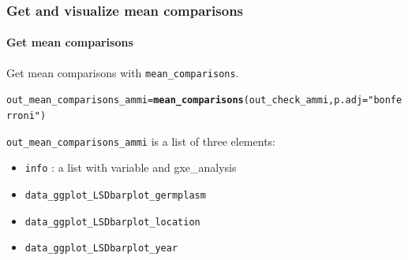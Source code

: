 \documentclass{article}\usepackage[]{graphicx}\usepackage[]{color}
\makeatletter
\newcommand{\hlstr}[1]{\textcolor[rgb]{0.192,0.494,0.8}{#1}}%
\newcommand{\hlopt}[1]{\textcolor[rgb]{0,0,0}{#1}}%
\newcommand{\hlstd}[1]{\textcolor[rgb]{0.345,0.345,0.345}{#1}}%
\newcommand{\hlkwb}[1]{\textcolor[rgb]{0.69,0.353,0.396}{#1}}%
\newcommand{\hlkwc}[1]{\textcolor[rgb]{0.333,0.667,0.333}{#1}}%
\newcommand{\hlkwd}[1]{\textcolor[rgb]{0.737,0.353,0.396}{\textbf{#1}}}%
\newenvironment{kframe}{%
 \def\at@end@of@kframe{}%
 \ifinner\ifhmode%
  \def\at@end@of@kframe{\end{minipage}}%
  \begin{minipage}{\columnwidth}%
 \fi\fi%
 \def\FrameCommand##1{\hskip\@totalleftmargin \hskip-\fboxsep
 \colorbox{shadecolor}{##1}\hskip-\fboxsep
     \hskip-\linewidth \hskip-\@totalleftmargin \hskip\columnwidth}%
 \MakeFramed {\advance\hsize-\width
   \@totalleftmargin\z@ \linewidth\hsize
   \@setminipage}}%
 {\par\unskip\endMakeFramed%
 \at@end@of@kframe}
\newenvironment{knitrout}{}{} %
\makeatother
\begin{document}


\subsubsection{Get and visualize mean comparisons}

\paragraph{Get mean comparisons}

Get mean comparisons with \texttt{mean\_comparisons}.

\begin{knitrout}
\color{fgcolor}\begin{kframe}
\begin{alltt}
\hlstd{out_mean_comparisons_ammi} \hlkwb{=} \hlkwd{mean_comparisons}\hlstd{(out_check_ammi,} \hlkwc{p.adj} \hlstd{=} \hlstr{"bonferroni"}\hlstd{)}
\end{alltt}
\end{kframe}
\end{knitrout}

\texttt{out\_mean\_comparisons\_ammi} is a list of three elements:

\begin{itemize}
\item \texttt{info} : a list with variable and gxe\_analysis
\item \texttt{data\_ggplot\_LSDbarplot\_germplasm}
\item \texttt{data\_ggplot\_LSDbarplot\_location}
\item \texttt{data\_ggplot\_LSDbarplot\_year}
\end{itemize}
\end{document}
